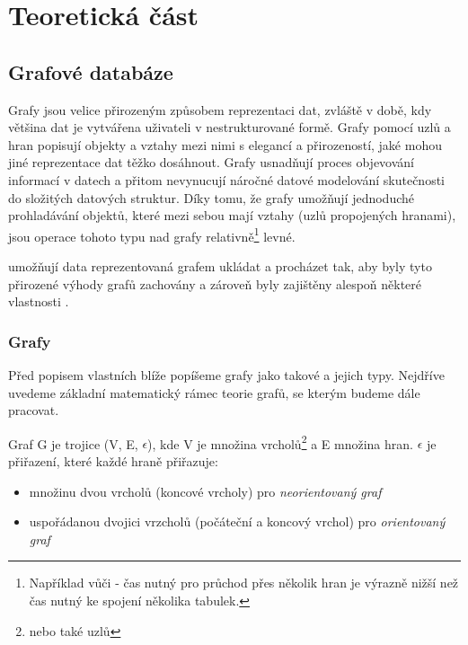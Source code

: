 \chapter{Teoretická část}

\section{Grafové databáze}

Grafy jsou velice přirozeným způsobem reprezentaci dat, zvláště v době, kdy většina dat je vytvářena uživateli v nestrukturované formě. Grafy pomocí uzlů a hran popisují objekty a vztahy mezi nimi s elegancí a přirozeností, jaké mohou jiné reprezentace dat těžko dosáhnout. Grafy usnadňují proces objevování informací v datech a přitom nevynucují náročné datové modelování skutečnosti do složitých datových struktur. Díky tomu, že grafy umožňují jednoduché prohladávání objektů, které mezi sebou mají vztahy (uzlů propojených hranami), jsou operace tohoto typu nad grafy relativně\footnote{Například vůči  - čas nutný pro průchod přes několik hran je výrazně nižší než čas nutný ke spojení několika tabulek.} levné. 

 umožňují data reprezentovaná grafem ukládat a procházet tak, aby byly tyto přirozené výhody grafů zachovány a zároveň byly zajištěny alespoň některé vlastnosti . 

\subsection{Grafy}
Před popisem vlastních  blíže popíšeme grafy jako takové a jejich typy. Nejdříve uvedeme základní matematický rámec teorie grafů, se kterým budeme dále pracovat. 

Graf G je trojice (V, E, $\epsilon$), kde V je množina vrcholů\footnote{nebo také uzlů} a E množina hran. $\epsilon$ je přiřazení, které každé hraně přiřazuje: 
\begin{itemize} 
	\item{} množinu dvou vrcholů (koncové vrcholy) pro \textit{neorientovaný graf}
	\item{} uspořádanou dvojici vrzcholů (počáteční a koncový vrchol) pro \textit{orientovaný graf}
\end{itemize}

